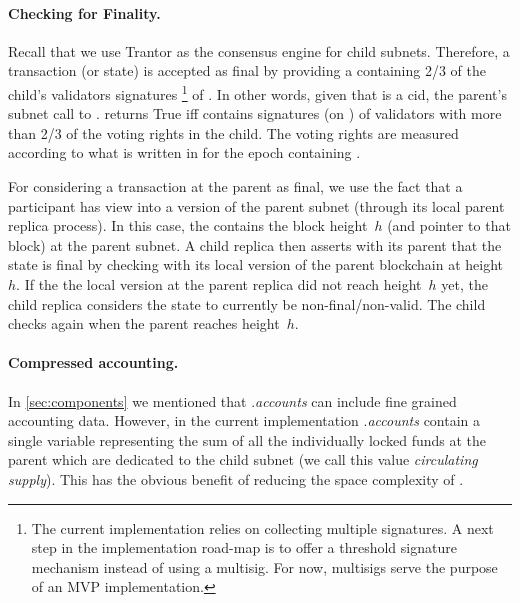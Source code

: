  \paragraph{Checking for Finality.}
 Recall that we use Trantor as the consensus engine for child subnets. Therefore, a transaction (or state) \tx is accepted as final by providing a \prf containing 2/3 of the child's validators signatures%
 \footnote{The current implementation relies on collecting multiple signatures. A next step in the implementation road-map is to offer a threshold signature mechanism instead of using a multisig. For now, multisigs serve the purpose of an MVP implementation.} 
 of \tx. 
 In other words, given that \tx is a cid, the parent's subnet call to \sa.\verifyGfinal{\tx}{\prf} returns True iff \prf contains signatures (on \tx) of validators with more than 2/3 of the voting rights in the child. The voting rights are measured according to what is written in \sa for the epoch containing \tx. 

 For considering a transaction \tx at the parent as final, we use the fact that a participant has view into a version of the parent subnet (through its local parent replica process). In this case, the \prf contains the block height~$h$ (and pointer to that block) at the parent subnet. A child replica then asserts with its parent that the state is final by checking with its local version of the parent blockchain at height~$h$. If the the local version at the parent replica did not reach height~$h$ yet, the child replica considers the state to currently be non-final/non-valid. The child checks again when the parent reaches height~$h$. 

\paragraph{Compressed accounting.}
In \cref{sec:components} we mentioned that \sa.\textit{accounts} can include fine grained accounting data. However, in the current implementation \sa.\textit{accounts} contain a single variable representing the sum of all the individually locked funds at the parent which are dedicated to the child subnet (we call this value \textit{circulating supply}). This has the obvious benefit of reducing the space complexity of \sa.


